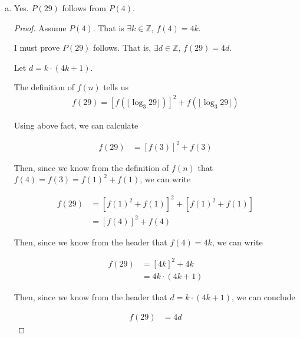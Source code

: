 \documentclass[12pt]{article}
\begin{document}
\begin{enumerate}[a.]
    \item

    Yes. $P(29)$ follows from $P(4)$.

    \bigskip

    \begin{proof}
    Assume $P(4)$. That is $\exists k \in \mathbb{Z}$, $f(4) = 4k$.

    \bigskip

    I must prove $P(29)$ follows. That is, $\exists d \in \mathbb{Z}$,
    $f(29) = 4d$.

    \bigskip

    Let $d = k \cdot (4k + 1)$.

    \bigskip

    The definition of $f(n)$ tells us
    \setcounter{equation}{0}
    \begin{align}
        f(29) = [f(\lfloor \log_3 29 \rfloor)]^2 + f(\lfloor \log_3 29 \rfloor)
    \end{align}

    \bigskip

    Using above fact, we can calculate

    \begin{align}
        f(29) &= [f(3)]^2 + f(3)
    \end{align}

    \bigskip

    Then, since we know from the definition of $f(n)$ that $f(4) = f(3) = f(1)^2 + f(1)$, we can write

    \begin{align}
        f(29) &= [f(1)^2 + f(1)]^2 + [f(1)^2 + f(1)]\\
        &= [f(4)]^2 + f(4)
    \end{align}

    \bigskip

    Then, since we know from the header that $f(4) = 4k$, we can write

    \begin{align}
        f(29) &= [4k]^2 + 4k\\
        &= 4k \cdot ( 4k + 1 )
    \end{align}

    Then, since we know from the header that $d = k \cdot (4k + 1)$, we can conclude

    \begin{align}
        f(29) &= 4d
    \end{align}

    \end{proof}


\end{enumerate}
\end{document}
